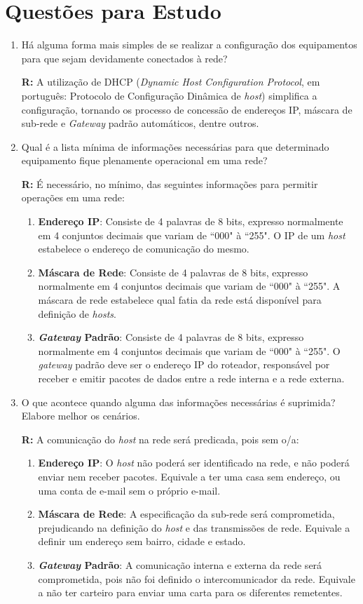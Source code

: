\section{Questões para Estudo}
	\begin{enumerate}
		\item{Há alguma forma mais simples de se realizar a configuração dos equipamentos para que sejam devidamente conectados à rede?

			\textbf{R:} A utilização de DHCP (\emph{Dynamic Host Configuration Protocol}, em português: Protocolo de Configuração Dinâmica de \emph{host}) simplifica a configuração, tornando os processo de concessão de endereços IP, máscara de sub-rede e \emph{Gateway} padrão automáticos, dentre outros.}
			\item{Qual é a lista mínima de informações necessárias para que determinado equipamento fique plenamente operacional em uma rede?

				\textbf{R:} É necessário, no mínimo, das seguintes informações para permitir operações em uma rede:
				\begin{enumerate}
					\item{\textbf{Endereço IP}: Consiste de 4 palavras de 8 bits, expresso normalmente em 4 conjuntos decimais que variam de ``000" à ``255". O IP de um \emph{host} estabelece o endereço de comunicação do mesmo.}
					\item{\textbf{Máscara de Rede}: Consiste de 4 palavras de 8 bits, expresso normalmente em 4 conjuntos decimais que variam de ``000" à ``255". A máscara de rede estabelece qual fatia da rede está disponível para definição de \emph{hosts}.}
					\item{\textbf{\emph{Gateway} Padrão}: Consiste de 4 palavras de 8 bits, expresso normalmente em 4 conjuntos decimais que variam de ``000" à ``255". O \emph{gateway} padrão deve ser o endereço IP do roteador, responsável por receber e emitir pacotes de dados entre a rede interna e a rede externa.}
				\end{enumerate}}
			\item{O que acontece quando alguma das informações necessárias é suprimida? Elabore melhor os cenários.

				\textbf{R:} A comunicação do \emph{host} na rede será predicada, pois sem o/a:
				\begin{enumerate}
					\item{\textbf{Endereço IP}: O \emph{host} não poderá ser identificado na rede, e não poderá enviar nem receber pacotes. Equivale a ter uma casa sem endereço, ou uma conta de e-mail sem o próprio e-mail.}
					\item{\textbf{Máscara de Rede}: A especificação da sub-rede será comprometida, prejudicando na definição do \emph{host} e das transmissões de rede. Equivale a definir um endereço sem bairro, cidade e estado.}
					\item{\textbf{\emph{Gateway} Padrão}: A comunicação interna e externa da rede será comprometida, pois não foi definido o intercomunicador da rede. Equivale a não ter carteiro para enviar uma carta para os diferentes remetentes.}
				\end{enumerate}}
		\end{enumerate}
